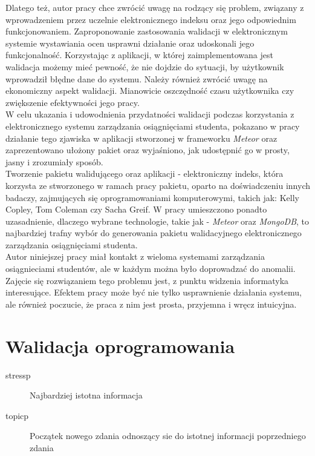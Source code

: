\documentclass[brudnopis]{xmgr}
\begin{document}
\textcolor{wc}{Dlatego też, autor pracy chce zwrócić uwagę na rodzący się problem, związany
z wprowadzeniem przez uczelnie elektronicznego indeksu oraz jego odpowiednim
funkcjonowaniem. Zaproponowanie zastosowania walidacji w elektronicznym systemie
wystawiania ocen usprawni działanie oraz udoskonali jego funkcjonalność.
Korzystając z aplikacji, w której zaimplementowana jest walidacja możemy mieć pewność,
że nie dojdzie do sytuacji, by użytkownik wprowadził błędne dane do systemu.
Należy również zwrócić uwagę na ekonomiczny aspekt walidacji. Mianowicie oszczędność
czasu użytkownika czy zwiększenie efektywności jego pracy.}
\\
\indent \textcolor{wc}{W celu ukazania i udowodnienia przydatności walidacji podczas korzystania
z elektronicznego systemu zarządzania osiągnięciami studenta, pokazano w pracy
działanie tego zjawiska w aplikacji stworzonej w frameworku \textit{Meteor} oraz
zaprezentowano ułożony pakiet oraz wyjaśniono, jak udostępnić go w prosty, jasny
i zrozumiały sposób.}
\\
\indent \textcolor{wd}{Tworzenie pakietu walidującego oraz aplikacji - elektroniczny indeks, która korzysta
ze stworzonego w ramach pracy pakietu, oparto na doświadczeniu innych badaczy,
zajmujących się oprogramowaniami komputerowymi, takich jak: Kelly Copley, Tom
Coleman czy Sacha Greif.} \textcolor{wa}{W pracy umieszczono ponadto uzasadnienie, dlaczego wybrane
technologie, takie jak - \textit{Meteor} oraz \textit{MongoDB}, to najbardziej trafny wybór do generowania
pakietu walidacyjnego elektronicznego zarządzania osiągnięciami studenta.}
\\
\indent \textcolor{wa}{Autor niniejszej pracy miał kontakt z wieloma systemami zarządzania osiągnieciami
studentów, ale w każdym można było doprowadzać do anomalii. Zajęcie się rozwiązaniem
tego problemu jest, z punktu widzenia informatyka interesujące. Efektem pracy może być
nie tylko usprawnienie działania systemu, ale również poczucie, że praca z nim jest
prosta, przyjemna i wręcz intuicyjna.}





\chapter{Walidacja oprogramowania}

\begin{description}
\item[stressp] \textcolor{sa}{Najbardziej istotna informacja} 
\item[topicp] \textcolor{sb}{Początek nowego zdania odnoszący sie do istotnej informacji poprzedniego zdania}
\end{description}
\end{document}
